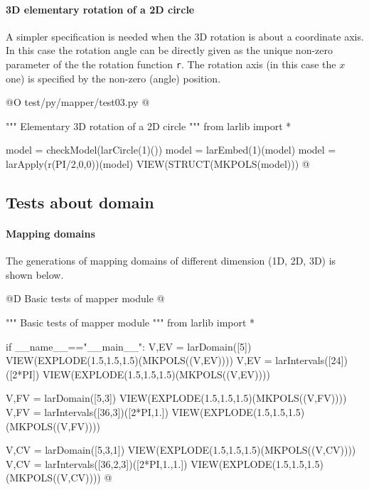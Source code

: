 \documentclass[11pt,oneside]{article}	%
\begin{document}
\paragraph{3D elementary rotation of a 2D circle}
A simpler specification is needed when the 3D rotation is about a coordinate axis. In this case the rotation angle can be directly given as the unique non-zero parameter of the the rotation function \texttt{r}. The rotation axis (in this case the $x$ one) is specified by the non-zero (angle) position.

@O test/py/mapper/test03.py
@{""" Elementary 3D rotation of a 2D circle """
from larlib import *

model = checkModel(larCircle(1)())
model = larEmbed(1)(model)
model = larApply(r(PI/2,0,0))(model)
VIEW(STRUCT(MKPOLS(model)))
@}




\subsection{Tests about domain}

\paragraph{Mapping domains}
The generations of mapping domains of different dimension (1D, 2D, 3D) is shown below.
	
@D Basic tests of mapper module
@{""" Basic tests of mapper module """
from larlib import *

if __name__=="__main__":
	V,EV = larDomain([5])
	VIEW(EXPLODE(1.5,1.5,1.5)(MKPOLS((V,EV))))
	V,EV = larIntervals([24])([2*PI])
	VIEW(EXPLODE(1.5,1.5,1.5)(MKPOLS((V,EV))))
		
	V,FV = larDomain([5,3])
	VIEW(EXPLODE(1.5,1.5,1.5)(MKPOLS((V,FV))))
	V,FV = larIntervals([36,3])([2*PI,1.])
	VIEW(EXPLODE(1.5,1.5,1.5)(MKPOLS((V,FV))))
		
	V,CV = larDomain([5,3,1])
	VIEW(EXPLODE(1.5,1.5,1.5)(MKPOLS((V,CV))))
	V,CV = larIntervals([36,2,3])([2*PI,1.,1.])
	VIEW(EXPLODE(1.5,1.5,1.5)(MKPOLS((V,CV))))
@}
\end{document}
